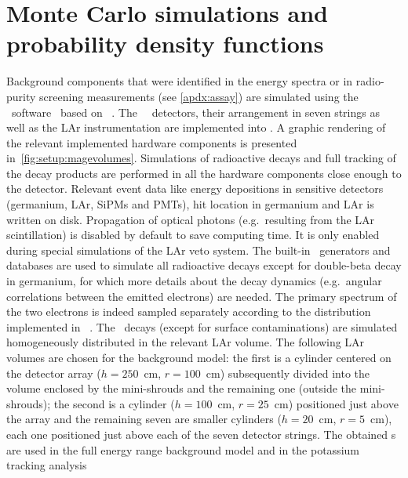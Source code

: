 
\chapter{Monte Carlo simulations and probability density functions}%
\label{apdx:magepdfs}

Background components that were identified in the energy spectra or in radio-purity
screening measurements (see \cref{apdx:assay}) are simulated using the \mage\
software~\cite{Boswell2011} based on \geant~\cite{Agostinelli2002, Allison2006,
Allison2016}.  The \gerda\ \phasetwo\ detectors, their arrangement in seven strings as
well as the LAr instrumentation are implemented into \mage. A graphic rendering of the
relevant implemented hardware components is presented in~\cref{fig:setup:magevolumes}.
\newpar
Simulations of radioactive decays and full tracking of the decay products are performed in
all the hardware components close enough to the detector. Relevant event data like energy
depositions in sensitive detectors (germanium, LAr, SiPMs and PMTs), hit location in
germanium and LAr is written on disk. Propagation of optical photons (e.g.~resulting from
the LAr scintillation) is disabled by default to save computing time. It is only enabled
during special simulations of the LAr veto system.  The built-in \geant\ generators and
databases are used to simulate all radioactive decays except for double-beta decay in
germanium, for which more details about the decay dynamics (e.g.~angular correlations
between the emitted electrons) are needed. The primary spectrum of the two electrons is
indeed sampled separately according to the distribution implemented in
\decayzero~\cite{Ponkratenko2000}.
\newpar
The \kvz\ decays (except for surface contaminations) are simulated homogeneously
distributed in the relevant LAr volume. The following LAr volumes are chosen for the
background model: the first is a cylinder centered on the detector array ($h=250$~cm,
$r=100$~cm) subsequently divided into the volume enclosed by the mini-shrouds and the
remaining one (outside the mini-shrouds); the second is a cylinder ($h=100$~cm, $r=25$~cm)
positioned just above the array and the remaining seven are smaller cylinders ($h=20$~cm,
$r=5$~cm), each one positioned just above each of the seven detector strings. The obtained
\pdf{}s are used in the full energy range background model and in the potassium tracking
analysis

